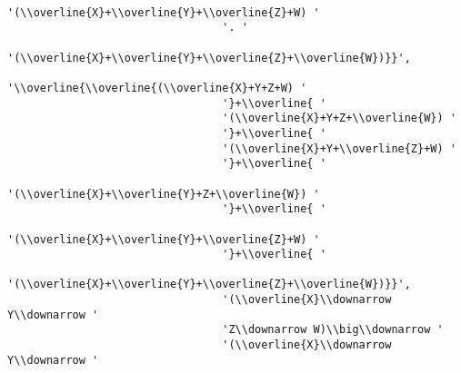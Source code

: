 \begin{verbatim}
                                 '(\\overline{X}+\\overline{Y}+\\overline{Z}+W) '
                                 '. '
                                 '(\\overline{X}+\\overline{Y}+\\overline{Z}+\\overline{W})}}',
                                 '\\overline{\\overline{(\\overline{X}+Y+Z+W) '
                                 '}+\\overline{ '
                                 '(\\overline{X}+Y+Z+\\overline{W}) '
                                 '}+\\overline{ '
                                 '(\\overline{X}+Y+\\overline{Z}+W) '
                                 '}+\\overline{ '
                                 '(\\overline{X}+\\overline{Y}+Z+\\overline{W}) '
                                 '}+\\overline{ '
                                 '(\\overline{X}+\\overline{Y}+\\overline{Z}+W) '
                                 '}+\\overline{ '
                                 '(\\overline{X}+\\overline{Y}+\\overline{Z}+\\overline{W})}}',
                                 '(\\overline{X}\\downarrow Y\\downarrow '
                                 'Z\\downarrow W)\\big\\downarrow '
                                 '(\\overline{X}\\downarrow Y\\downarrow '

\end{verbatim}
